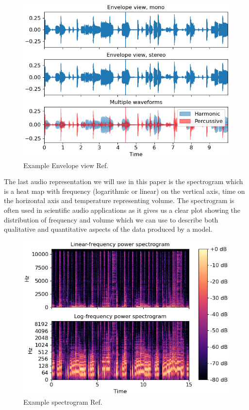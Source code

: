 \documentclass{article}
\begin{document}
\begin{figure}[H]
\centering
\caption{Example Envelope view Ref. \cite{mcfee2015librosa}}
\includegraphics[scale=0.5]{librosa-display-waveshow-1_00.png}
\end{figure}
The last audio representation we will use in this paper is the spectrogram which is a heat map with frequency (logarithmic or linear) on the vertical axis, time on the horizontal axis and temperature representing volume. The spectrogram is often used in scientific audio applications as it gives us a clear plot showing the distribution of frequency and volume which we can use to describe both qualitative and quantitative aspects of the data produced by a model. 
\begin{figure}[H]
\centering
\caption{Example spectrogram Ref. \cite{mcfee2015librosa}}
\includegraphics[scale=0.5]{librosa-display-specshow-1.png}
\end{figure}
\label{sec:data}
\end{document}

